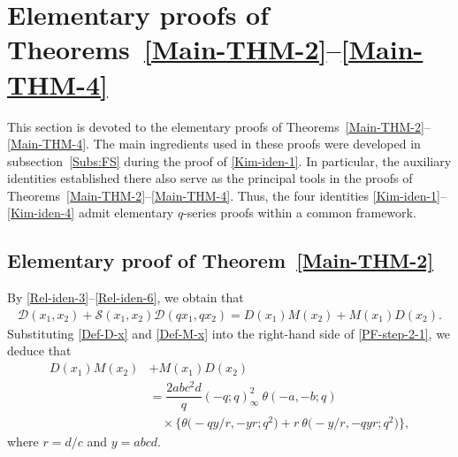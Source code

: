 \documentclass[12pt,reqno]{amsart}
\numberwithin{equation}{section}
\theoremstyle{plain}
\theoremstyle{definition}
\begin{document}
\section{Elementary proofs of Theorems~\ref{Main-THM-2}--\ref{Main-THM-4}}
\label{Sect:EP-2}

This section is devoted to the elementary proofs of
Theorems~\ref{Main-THM-2}--\ref{Main-THM-4}. The main ingredients used in these proofs
were developed in subsection~\ref{Subs:FS} during the proof of \eqref{Kim-iden-1}. In
particular, the auxiliary identities established there also serve as the principal
tools in the proofs of Theorems~\ref{Main-THM-2}--\ref{Main-THM-4}. Thus, the four
identities \eqref{Kim-iden-1}--\eqref{Kim-iden-4} admit elementary $q$-series proofs
within a common framework.

\subsection{Elementary proof of Theorem~\ref{Main-THM-2}}
By \eqref{Rel-iden-3}--\eqref{Rel-iden-6}, we obtain that
\begin{align}
\mathscr{D}(x_1,x_2)+\mathscr{S}(x_1,x_2)\mathscr{D}(qx_1,qx_2)=D(x_1)M(x_2)
+M(x_1)D(x_2).\label{PF-step-2-1}
\end{align}
Substituting \eqref{Def-D-x} and \eqref{Def-M-x} into the right-hand side of
\eqref{PF-step-2-1}, we deduce that
\begin{align}
D(x_1)M(x_2) &+M(x_1)D(x_2)\nonumber\\
 &=\dfrac{2abc^2d}{q}(-q;q)_\infty^2\!\:\theta(-a,-b;q)\nonumber\\
 &\quad\times\big\{\theta\big({-}qy/r,-yr;q^2\big)
+r\!\:\theta\big({-}y/r,-qyr;q^2\big)\big\},\label{PF-step-2-2}
\end{align}
where $r=d/c$ and $y=abcd$.
\end{document}
